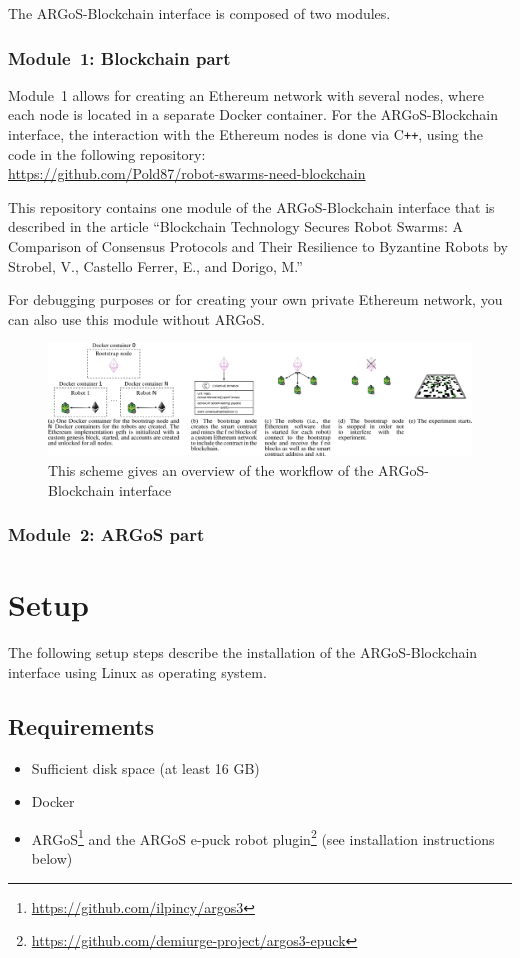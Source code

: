 \documentclass{article}
\begin{document}
The ARGoS-Blockchain interface is composed of two modules. 

\subsubsection{Module~1: Blockchain part}
Module~1 allows for creating an Ethereum network with several nodes,
where each node is located in a separate Docker container. For the
ARGoS-Blockchain interface, the interaction with the Ethereum nodes is
done via C\texttt{++}, using the code in the following repository:\\
\url{https://github.com/Pold87/robot-swarms-need-blockchain}

This repository contains one module of the ARGoS-Blockchain interface
that is described in the article ``Blockchain Technology Secures Robot
Swarms: A Comparison of Consensus Protocols and Their Resilience to
Byzantine Robots by Strobel, V., Castello Ferrer, E., and Dorigo, M.''

For debugging purposes or for creating your own private Ethereum
network, you can also use this module without ARGoS.

\begin{figure}[t]
  \centering
  \includegraphics[width=\textwidth]{interface}
  \caption[Overview of the ARGoS-Blockchain interface]{This scheme
    gives an overview of the workflow of the ARGoS-Blockchain
    interface}
  \label{fig:interface}
\end{figure}

\subsubsection{Module~2: ARGoS part}

\section{Setup}

The following setup steps describe the installation of the
ARGoS-Blockchain interface using Linux as operating system.

\subsection{Requirements}
\begin{itemize}
\item Sufficient disk space (at least 16 GB)
\item Docker 
\item ARGoS\footnote{\url{https://github.com/ilpincy/argos3}} and the
  ARGoS e-puck robot
  plugin\footnote{\url{https://github.com/demiurge-project/argos3-epuck}}
  (see installation instructions below)
\end{itemize}
\end{document}
